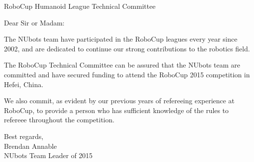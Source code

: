 \documentclass{letter}
\begin{document}
\begin{letter}{RoboCup Humanoid League Technical Committee}
\opening{Dear Sir or Madam:}
The NUbots team have participated in the RoboCup leagues every year since 2002, and are dedicated to continue our strong contributions to the robotics field.

The RoboCup Technical Committee can be assured that the NUbots team are committed and have secured funding to attend the RoboCup 2015 competition in Hefei, China.

We also commit, as evident by our previous years of refereeing experience at RoboCup, to provide a person who has sufficient knowledge of the rules to refereee throughout the competition.

Best regards, \\ Brendan Annable \\ NUbots Team Leader of 2015

\end{letter}
\end{document}
